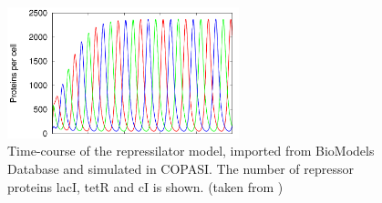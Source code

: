 \begin{figure}
\centering
\includegraphics[width=0.6\textwidth]{images/simEx1.png}
\caption{Time-course of the repressilator model, imported from BioModels Database and simulated in COPASI. The number of repressor proteins lacI, tetR and cI is shown. (taken from \citep{Waltemath:2010})}
\label{fig:simEx1}
\end{figure}

